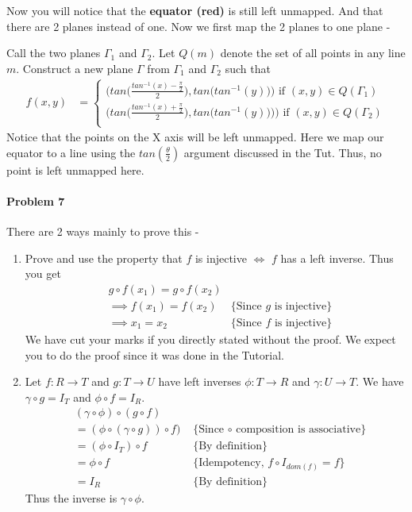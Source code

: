 \documentclass[12pt]{scrartcl}
\begin{document}
Now you will notice that the \textbf{equator (red)} is still left unmapped. And that there are 2 planes instead of one. Now we first map the 2 planes to one plane - 

Call the two planes $\Gamma_1$ and $\Gamma_2$. Let $Q(m)$ denote the set of all points in any line $m$. Construct a new plane $\Gamma$ from $\Gamma_1$ and $\Gamma_2$ such that 
\begin{align*}
f(x,y) &=
    \begin{cases}
     \bigg(tan\bigg(\frac{tan^{-1}(x) -  \frac{\pi}{2}}{2}\bigg),tan\bigg(tan^{-1}(y)\bigg)\bigg) \text{ if $(x,y) \in Q(\Gamma_1)$}\\ 
     \bigg(tan\bigg(\frac{tan^{-1}(x) + \frac{\pi}{2}}{2}\bigg),tan\bigg(tan^{-1}(y))\bigg)\bigg) \text{ if $(x,y) \in Q(\Gamma_2)$}\\
    \end{cases}
\end{align*}
Notice that the points on the X axis will be left unmapped. Here we map our equator to a line using the $tan(\frac{\theta}{2})$ argument discussed in the Tut. Thus, no point is left unmapped here.
\paragraph*{Problem 7}
There are 2 ways mainly to prove this - 
\begin{enumerate}
    \item Prove and use the property that $f$ is injective $\iff$ $f$ has a left inverse. Thus you get 
    \begin{align*}
         & g \circ f (x_1) = g \circ f(x_2)
        \\ & \implies f(x_1) = f(x_2) & \text{\{Since $g$ is injective\}}
        \\ & \implies x_1 = x_2 & \text{\{Since $f$ is injective\}}
     \end{align*}
     We have cut your marks if you directly stated without the proof. We expect you to do the proof since it was done in the Tutorial.
    \item Let $f:R \rightarrow T$ and $g:T \rightarrow U$ have left inverses $\phi:T \rightarrow R$ and $\gamma: U \rightarrow T$. We have  $\gamma \circ g = I_T$ and $\phi \circ f = I_R$.
    \begin{align*}
        & ( \gamma \circ \phi ) \circ (g \circ f) 
        \\ &= (\phi  \circ (\gamma  \circ g)) \circ f) & \text{ \{Since $\circ$ composition is associative\}}
        \\ &= (\phi \circ I_T) \circ f & \text{ \{By definition\}}
        \\ &= \phi \circ f & \text{ \{Idempotency, $f \circ I_{dom(f)} = f$\}}
        \\ &= I_R & \text{ \{By definition\}}
    \end{align*}
    Thus the inverse is $\gamma \circ \phi$.
\end{enumerate}
\end{document}
